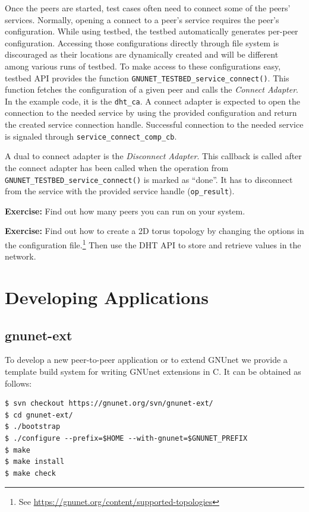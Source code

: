 \documentclass[10pt]{article}
\newcommand{\exercise}[1]{\noindent\begin{boxedminipage}{\textwidth}{\bf Exercise:} #1 \end{boxedminipage}}
\begin{document}
Once the peers are started, test cases often need to connect some of the peers'
services.  Normally, opening a connect to a peer's service requires the peer's
configuration.  While using testbed, the testbed automatically generates
per-peer configuration.  Accessing those configurations directly through file
system is discouraged as their locations are dynamically created and will be
different among various runs of testbed.  To make access to these configurations
easy, testbed API provides the function
\texttt{GNUNET\_TESTBED\_service\_connect()}.  This function fetches the
configuration of a given peer and calls the \textit{Connect Adapter}.
In the example code, it is the \texttt{dht\_ca}.  A connect adapter is expected
to open the connection to the needed service by using the provided configuration
and return the created service connection handle.  Successful connection to the
needed service is signaled through \texttt{service\_connect\_comp\_cb}.

A dual to connect adapter is the \textit{Disconnect Adapter}.  This callback is
called after the connect adapter has been called when the operation from
\texttt{GNUNET\_TESTBED\_service\_connect()} is marked as ``done''.  It has to
disconnect from the service with the provided service handle (\texttt{op\_result}).

\exercise{Find out how many peers you can run on your system.}

\exercise{Find out how to create a 2D torus topology by changing the
  options in the configuration file.\footnote{See \url{https://gnunet.org/content/supported-topologies}}
  Then use the DHT API to store and retrieve values in the
  network.}

\section{Developing Applications}
\subsection{gnunet-ext}
To develop a new peer-to-peer application or to extend GNUnet we provide
a template build system for writing GNUnet extensions in C. It can be
obtained as follows:

\lstset{language=bash}
\begin{lstlisting}
$ svn checkout https://gnunet.org/svn/gnunet-ext/
$ cd gnunet-ext/
$ ./bootstrap
$ ./configure --prefix=$HOME --with-gnunet=$GNUNET_PREFIX
$ make
$ make install
$ make check
\end{lstlisting}
\end{document}
